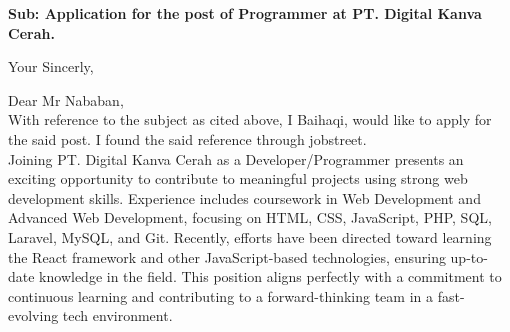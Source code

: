 \documentclass[11pt,a4paper,roman]{moderncv}
\begin{document}
\date{\today}
\opening{\textbf{Sub: Application for the post of Programmer at PT. Digital Kanva Cerah.}}
\closing{Your Sincerly, \vspace{-1em}}


\makelettertitle



Dear Mr Nababan,
\\
\vspace{1em}
With reference to the subject as cited above, I Baihaqi, would like to apply for the said post. I found the said reference through jobstreet.\\

\vspace{1em}
Joining PT. Digital Kanva Cerah as a Developer/Programmer presents an exciting opportunity to contribute to meaningful projects using strong web development skills. Experience includes coursework in Web Development and Advanced Web Development, focusing on HTML, CSS, JavaScript, PHP, SQL, Laravel, MySQL, and Git. Recently, efforts have been directed toward learning the React framework and other JavaScript-based technologies, ensuring up-to-date knowledge in the field. This position aligns perfectly with a commitment to continuous learning and contributing to a forward-thinking team in a fast-evolving tech environment. \\
\vspace{1em}
\end{document}
